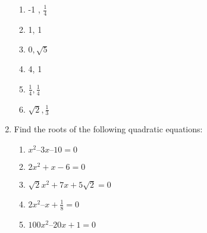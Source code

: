 \begin{enumerate}[label=\arabic*.,ref=\thesubsection.\theenumi]
\begin{enumerate}
\item-1 , $\frac{1}{ 4}$
\item 1, 1
\item $0, \sqrt{5}$ 
\item 4, 1
 \item $\frac{1}{4}, \frac{1}{4}$
\item  $\sqrt{2}, \frac{1}{ 3}$
\end{enumerate}
\item Find the roots of the following quadratic equations:
\begin{enumerate}
\item $x^2 – 3x – 10=0$
\item $2x^2+x-6=0$
\item $\sqrt{2}x^2 +7x+5\sqrt{2}  = 0$
\item $2x^2– x +\frac{1}{8} = 0 $
\item $100x^2 – 20x +1 = 0$
\end{enumerate}
\end{enumerate}
